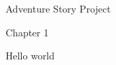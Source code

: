 \documentclass{article}
\begin{document}
\Huge Adventure Story Project

Chapter 1

Hello world 
\end{document}
